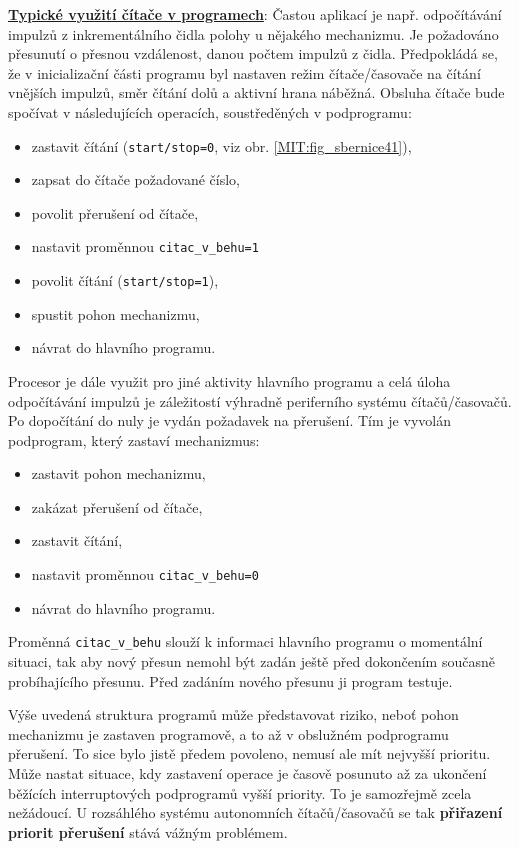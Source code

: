         \underline{\textbf{Typické využití čítače v programech}}:
        Častou aplikací je např. odpočítávání impulzů z inkrementálního čidla polohy u nějakého 
        mechanizmu. Je požadováno přesunutí o přesnou vzdálenost, danou počtem impulzů z čidla. 
        Předpokládá se, že v inicializační části programu byl nastaven režim čítače/časovače na 
        čítání vnějších impulzů, směr čítání dolů a aktivní hrana náběžná. Obsluha čítače bude 
        spočívat v následujících operacích, soustředěných v podprogramu:
        \begin{itemize}[noitemsep]
          \item zastavit čítání (\texttt{start/stop=0}, viz obr. \ref{MIT:fig_sbernice41}),
          \item zapsat do čítače požadované číslo,
          \item povolit přerušení od čítače,
          \item nastavit proměnnou \texttt{citac\_v\_behu=1}
          \item povolit čítání (\texttt{start/stop=1}),
          \item spustit pohon mechanizmu,
          \item návrat do hlavního programu.          
        \end{itemize}
        Procesor je dále využit pro jiné aktivity hlavního programu a celá úloha odpočítávání 
        impulzů je záležitostí výhradně periferního systému čítačů/časovačů. Po dopočítání do nuly 
        je vydán požadavek na přerušení. Tím je vyvolán podprogram, který zastaví mechanizmus:
        \begin{itemize}[noitemsep]
          \item zastavit pohon mechanizmu,
          \item zakázat přerušení od čítače,
          \item zastavit čítání,
          \item nastavit proměnnou \texttt{citac\_v\_behu=0}
          \item návrat do hlavního programu.          
        \end{itemize}
        
        Proměnná \texttt{citac\_v\_behu} slouží k informaci hlavního programu o momentální situaci, 
        tak aby nový přesun nemohl být zadán ještě před dokončením současně probíhajícího přesunu. 
        Před zadáním nového přesunu ji program testuje.
        
        Výše uvedená struktura programů může představovat riziko, neboť pohon mechanizmu je 
        zastaven programově, a to až v obslužném podprogramu přerušení. To sice bylo jistě předem 
        povoleno, nemusí ale mít nejvyšší prioritu. Může nastat situace, kdy zastavení operace je 
        časově posunuto až za ukončení běžících interruptových podprogramů vyšší priority. To je 
        samozřejmě zcela nežádoucí. U rozsáhlého systému autonomních čítačů/časovačů se tak 
        \textbf{přiřazení priorit přerušení} stává vážným problémem.
        
